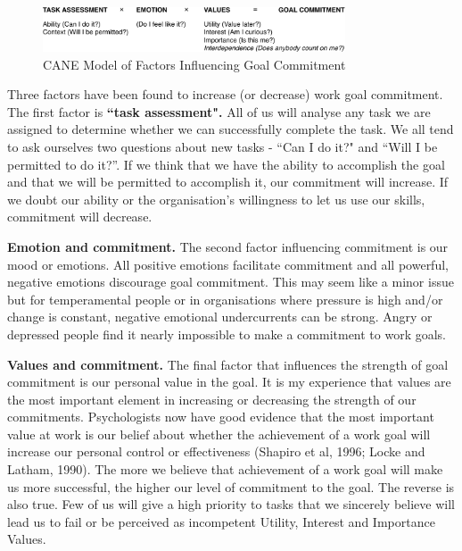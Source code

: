 \begin{figure}[b]
	\centering
	\includegraphics[width=0.8\textwidth]{resources/goal-commitment.pdf}
	\caption[CANE Model of Factors Influencing Goal Commitment]{CANE Model of Factors Influencing Goal Commitment}
\end{figure}

Three factors have been found to increase (or decrease) work goal commitment. The first factor is {\bf ``task assessment".} All of us will analyse any task we are assigned to determine whether we can successfully complete the task. We all tend to ask ourselves two questions about new tasks - ``Can I do it?" and “Will I be permitted to do it?”. If we think that we have the ability to accomplish the goal and that we will be permitted to accomplish it, our commitment will increase. If we doubt our ability or the organisation’s willingness to let us use our skills, commitment will decrease.

{\bf Emotion and commitment.} The second factor influencing commitment is our mood or emotions. All positive emotions facilitate commitment and all powerful, negative emotions discourage goal commitment. This may seem like a minor issue but for temperamental people or in organisations where pressure is high and/or change is constant, negative emotional undercurrents can be strong. Angry or depressed people find it nearly impossible to make a commitment to work goals.

{\bf Values and commitment.} The final factor that influences the strength of goal commitment is our personal value in the goal. It is my experience that values are the most important element in increasing or decreasing the strength of our commitments. Psychologists now have good evidence that the most important value at work is our belief about whether the achievement of a work goal will increase our personal control or effectiveness (Shapiro et al, 1996; Locke and Latham, 1990). The more we believe that achievement of a work goal will make us more successful, the higher our level of commitment to the goal. The reverse is also true. Few of us will give a high priority to tasks that we sincerely believe will lead us to fail or be perceived as incompetent Utility, Interest and Importance Values.


